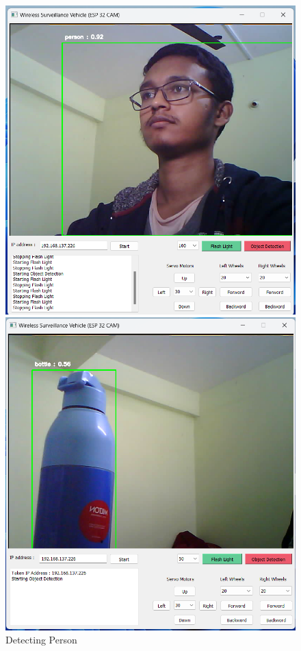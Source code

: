 \documentclass[12pt,a4paper]{report}
\begin{document}
\begin{enumerate}
   
    \begin{figure}[H]
    \centering
    \begin{minipage}{0.30\textwidth}
        \centering
        \includegraphics[width=\textwidth]{person}  %
        \caption{Detecting Person}
        \label{fig:person}
    \end{minipage} \hfill
    \begin{minipage}{0.30\textwidth}
        \centering
        \includegraphics[width=\textwidth]{bottle}  %

\end{minipage}
\end{figure}
\end{enumerate}
\end{document}
